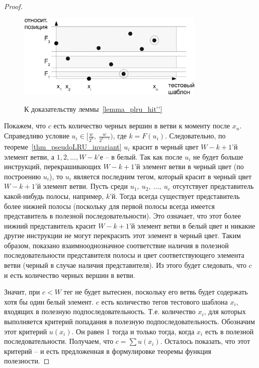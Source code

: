 \begin{proof}
\begin{figure}[h] \center
  \includegraphics[width=0.8\textwidth]{2.theor/plru-feeds-useful}\\
  \caption{К доказательству леммы~\ref{lemma_plru_hit''}}\label{plru-feeds-useful}
\end{figure}

  Покажем, что $c$ есть количество черных вершин в ветви к моменту
  после $x_n$. Справедливо условие $u_i \in
  [\frac{w}{2^k},~\frac{w}{2^{k-1}})$, где $k = F(u_i)$.
  Следовательно, по теореме~\ref{thm_pseudoLRU_invariant} $u_i$
  красит в черный цвет $W-k+1$'й элемент ветви, а $1, 2,..., W-k$'е
  -- в белый. Так как после $u_i$ не будет больше инструкций,
  перекрашивающих $W{-}k{+}1$'й элемент ветви в черный цвет (по
  построению $u_i$), то $u_i$ является последним тегом, который
  красит в черный цвет $W-k+1$'й элемент ветви. Пусть среди
  $u_1,~u_2,~\dots,~u_c$ отсутствует представитель какой-нибудь
  полосы, например, $k$'й. Тогда всегда существует представитель
  более нижней полосы (поскольку для первой полосы всегда имеется
  представитель в полезной последовательности). Это означает, что
  этот более нижний представитель красит $W{-}k{+}1$'й элемент ветви
  в белый цвет и никакие другие инструкции не могут перекрасить этот
  элемент в черный цвет. Таким образом, показано взаимнооднозначное
  соответствие наличия в полезной последовательности представителя
  полосы и цвет соответствующего элемента ветви (черный в случае
  наличия представителя). Из этого будет следовать, что $c$ и есть
  количество черных вершин в ветви.

  Значит, при $c < W$ тег не будет вытеснен, поскольку его ветвь
  будет содержать хотя бы один белый элемент. $c$ есть количество
  тегов тестового шаблона $x_i$, входящих в полезную
  подпоследовательность. Т.е. количество $x_i$, для которых
  выполняется критерий попадания в полезную подпоследовательность.
  Обозначим этот критерий $u(x_i)$. Он равен 1 тогда и только тогда,
  когда $x_i$ есть в полезной последовательности. Получаем, что $c =
  \sum u(x_i)$. Осталось показать, что этот критерий -- и есть
  предложенная в формулировке теоремы функция полезности.


\end{proof}

